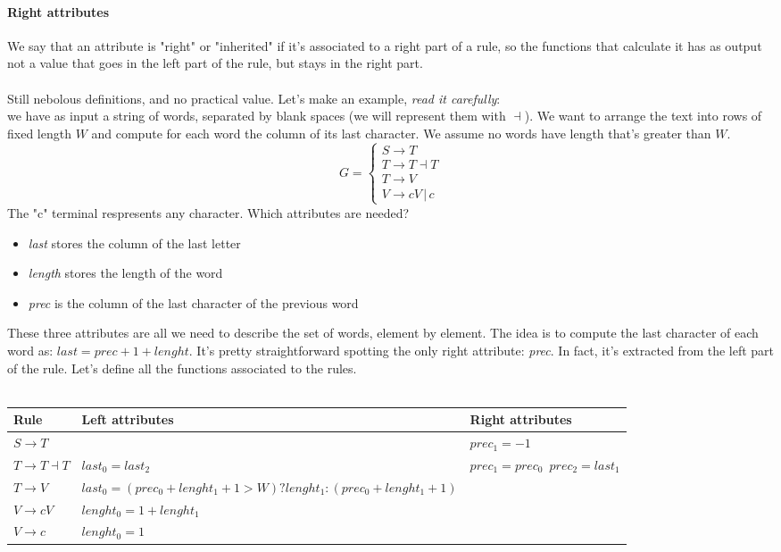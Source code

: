 \documentclass[10pt,a4paper]{article}
\begin{document}
					\paragraph{Right attributes}
						We say that an attribute is "right" or "inherited" if it's associated to a right part of a rule, so the functions that calculate it has as output not a value that goes in the left part of the rule, but stays in the right part.  
					\\\\Still nebolous definitions, and no practical value. Let's make an example, \emph{read it carefully}:\\
					we have as input a string of words, separated by blank spaces (we will represent them with $\dashv$). We want to arrange the text into rows of fixed length $W$ and compute for each word the column of its last character. We assume no words have length that's greater than $W$. 
					\begin{equation}
						G = 
						\begin{cases}
							S \rightarrow T \\
							T \rightarrow T \dashv T \\
							T \rightarrow V \\
							V \rightarrow cV \,\vert\, c
						\end{cases}
					\end{equation}
					The "c" terminal respresents any character. Which attributes are needed?
					\begin{itemize}
						\item \emph{last} stores the column of the last letter
						\item \emph{length} stores the length of the word
						\item \emph{prec} is the column of the last character of the previous word
					\end{itemize}
					These three attributes are all we need to describe the set of words, element by element. The idea is to compute the last character of each word as: $last = prec + 1 + lenght$. It's pretty straightforward spotting the only right attribute: \emph{prec}. In fact, it's extracted from the left part of the rule. Let's define all the functions associated to the rules.\\\\
					\begin{center}
						\begin{tabular}{| m{3cm} || m{3cm} | m{3cm} | }
							Rule & Left attributes & Right attributes \\
							\hline
							$S \rightarrow T$ & & $prec_1 = -1$\\
							\hline
							$T \rightarrow T \dashv T$ & $last_0 = last_2$ & $prec_1 = prec_0\,\,\,prec_2 = last_1$ \\
							\hline
							$T \rightarrow V $ & $last_0 = (prec_0 + lenght_1 + 1 > W) ? lenght_1 : (prec_0 + lenght_1 + 1)$ &\\
							\hline
							$V \rightarrow cV$ & $lenght_0 = 1 + lenght_1$ & \\
							\hline
							$V \rightarrow c$ & $lenght_0 = 1$ &  
						\end{tabular}
					\end{center}
\end{document}

